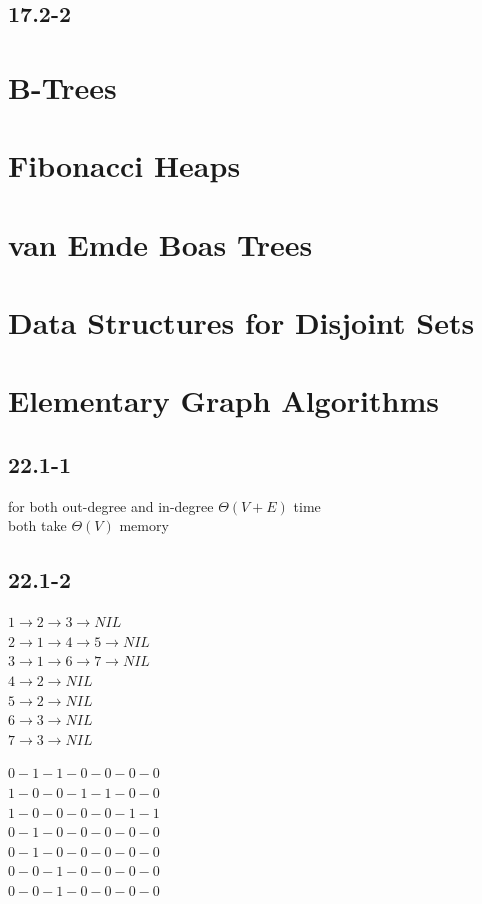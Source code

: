 \documentclass[]{article}
\begin{document}
\subsection{17.2-2}


\section{B-Trees}
\section{Fibonacci Heaps}
\section{van Emde Boas Trees}
\section{Data Structures for Disjoint Sets}

\section{Elementary Graph Algorithms}

\subsection{22.1-1}
for both out-degree and in-degree $\Theta (V+E)$ time\\
both take $\Theta (V)$ memory

\subsection{22.1-2}

$1 \rightarrow 2 \rightarrow 3 \rightarrow NIL$\\
$2 \rightarrow 1 \rightarrow 4 \rightarrow 5 \rightarrow NIL$\\
$3 \rightarrow 1 \rightarrow 6 \rightarrow 7 \rightarrow NIL$\\
$4 \rightarrow 2 \rightarrow NIL$\\
$5 \rightarrow 2 \rightarrow NIL$\\
$6 \rightarrow 3 \rightarrow NIL$\\
$7 \rightarrow 3 \rightarrow NIL$

$0-1-1-0-0-0-0$\\
$1-0-0-1-1-0-0$\\
$1-0-0-0-0-1-1$\\
$0-1-0-0-0-0-0$\\
$0-1-0-0-0-0-0$\\
$0-0-1-0-0-0-0$\\
$0-0-1-0-0-0-0$
\end{document}
